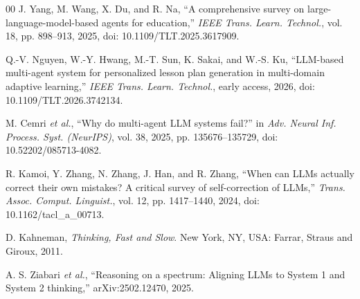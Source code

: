 \begin{thebibliography}{00}
 J. Yang, M. Wang, X. Du, and R. Na, ``A comprehensive survey on large-language-model-based agents for education,'' \emph{IEEE Trans. Learn. Technol.}, vol. 18, pp. 898--913, 2025, doi: 10.1109/TLT.2025.3617909.

 Q.-V. Nguyen, W.-Y. Hwang, M.-T. Sun, K. Sakai, and W.-S. Ku, ``LLM-based multi-agent system for personalized lesson plan generation in multi-domain adaptive learning,'' \emph{IEEE Trans. Learn. Technol.}, early access, 2026, doi: 10.1109/TLT.2026.3742134.

 M. Cemri \emph{et al.}, ``Why do multi-agent LLM systems fail?'' in \emph{Adv. Neural Inf. Process. Syst. (NeurIPS)}, vol. 38, 2025, pp. 135676--135729, doi: 10.52202/085713-4082.

 R. Kamoi, Y. Zhang, N. Zhang, J. Han, and R. Zhang, ``When can LLMs actually correct their own mistakes? A critical survey of self-correction of LLMs,'' \emph{Trans. Assoc. Comput. Linguist.}, vol. 12, pp. 1417--1440, 2024, doi: 10.1162/tacl\_a\_00713.


 D. Kahneman, \emph{Thinking, Fast and Slow}. New York, NY, USA: Farrar, Straus and Giroux, 2011.

 A. S. Ziabari \emph{et al.}, ``Reasoning on a spectrum: Aligning LLMs to System 1 and System 2 thinking,'' arXiv:2502.12470, 2025.


\end{thebibliography}
